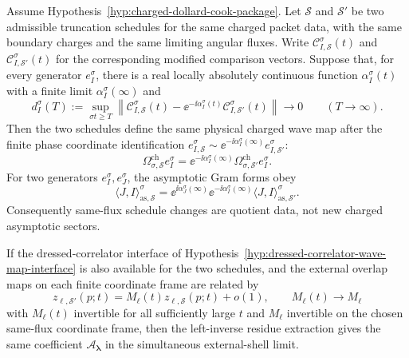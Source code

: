 \begin{proposition}
\label{prop:charged-same-flux-schedule-invariance}
Assume Hypothesis~\ref{hyp:charged-dollard-cook-package}.  Let
\(\mathcal S\) and \(\mathcal S'\) be two admissible truncation schedules for
the same charged packet data, with the same boundary charges and the same
limiting angular fluxes.  Write
\(\mathcal C_{I,\mathcal S}^{\sigma}(t)\) and
\(\mathcal C_{I,\mathcal S'}^{\sigma}(t)\) for the corresponding modified
comparison vectors.  Suppose that, for every generator \(e_I^\sigma\), there is
a real locally absolutely continuous function \(\alpha_I^\sigma(t)\) with a
finite limit \(\alpha_I^\sigma(\infty)\) and
\begin{equation}
  d_I^\sigma(T)
  :=
  \sup_{\sigma t\ge T}
  \left\|
    \mathcal C_{I,\mathcal S}^{\sigma}(t)
    -
    \ee^{-\ii\alpha_I^\sigma(t)}
    \mathcal C_{I,\mathcal S'}^{\sigma}(t)
  \right\|
  \longrightarrow 0
  \qquad (T\to\infty).
  \label{eq:charged-same-flux-schedule-tail}
\end{equation}
Then the two schedules define the same physical charged wave map after the
finite phase coordinate identification
\(e_{I,\mathcal S}^{\sigma}\sim
\ee^{-\ii\alpha_I^\sigma(\infty)}e_{I,\mathcal S'}^{\sigma}\):
\begin{equation}
  \Omega_{\sigma,\mathcal S}^{\mathrm{ch}}e_I^\sigma
  =
  \ee^{-\ii\alpha_I^\sigma(\infty)}
  \Omega_{\sigma,\mathcal S'}^{\mathrm{ch}}e_I^\sigma .
  \label{eq:charged-same-flux-wave-map-invariance}
\end{equation}
For two generators \(e_I^\sigma,e_J^\sigma\), the asymptotic Gram forms obey
\begin{equation}
  \langle J,I\rangle_{\mathrm{as},\mathcal S}^{\sigma}
  =
  \ee^{\ii\alpha_J^\sigma(\infty)}
  \ee^{-\ii\alpha_I^\sigma(\infty)}
  \langle J,I\rangle_{\mathrm{as},\mathcal S'}^{\sigma}.
  \label{eq:charged-same-flux-gram-invariance}
\end{equation}
Consequently same-flux schedule changes are quotient data, not new charged
asymptotic sectors.

If the dressed-correlator interface of
Hypothesis~\ref{hyp:dressed-correlator-wave-map-interface} is also available
for the two schedules, and the external overlap maps on each finite coordinate
frame are related by
\[
  z_{\ell,\mathcal S'}(p;t)
  =
  M_\ell(t) z_{\ell,\mathcal S}(p;t)+o(1),
  \qquad
  M_\ell(t)\longrightarrow M_\ell
\]
with \(M_\ell(t)\) invertible for all sufficiently large \(t\) and
\(M_\ell\) invertible on the chosen same-flux coordinate frame, then the
left-inverse residue extraction gives the same coefficient
\(\mathcal A_{\boldsymbol\lambda}\) in the simultaneous external-shell limit.
\end{proposition}

